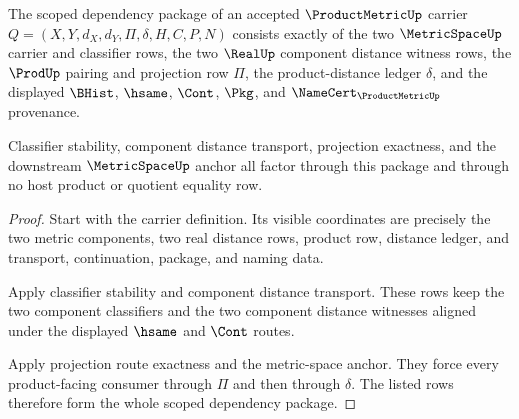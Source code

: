 \begin{theorem}
\label{thm:productmetric-scoped-dependency-package}
The scoped dependency package of an accepted $\ProductMetricUp$ carrier $Q=(X,Y,d_X,d_Y,\Pi,\delta,H,C,P,N)$ consists exactly of the two $\MetricSpaceUp$ carrier and classifier rows, the two $\RealUp$ component distance witness rows, the $\ProdUp$ pairing and projection row $\Pi$, the product-distance ledger $\delta$, and the displayed $\BHist$, $\hsame$, $\Cont$, $\Pkg$, and $\NameCert_{\ProductMetricUp}$ provenance.

Classifier stability, component distance transport, projection exactness, and the downstream $\MetricSpaceUp$ anchor all factor through this package and through no host product or quotient equality row.
\end{theorem}
\begin{proof}
Start with the carrier definition. Its visible coordinates are precisely the two metric components, two real distance rows, product row, distance ledger, and transport, continuation, package, and naming data.

Apply classifier stability and component distance transport. These rows keep the two component classifiers and the two component distance witnesses aligned under the displayed $\hsame$ and $\Cont$ routes.

Apply projection route exactness and the metric-space anchor. They force every product-facing consumer through $\Pi$ and then through $\delta$. The listed rows therefore form the whole scoped dependency package.
\end{proof}

